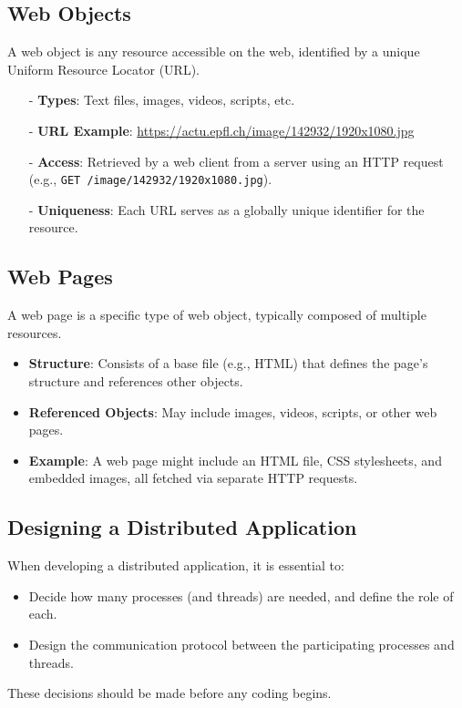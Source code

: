 \documentclass[../../compsys.tex]{subfiles}
\begin{document}
\subsection{Web Objects}
A web object is any resource accessible on the web, identified by a unique Uniform Resource Locator (URL).

\begin{itemize}[label=$\bullet$]
    \item[-] \textbf{Types}: Text files, images, videos, scripts, etc.
    \item[-] \textbf{URL Example}: \url{https://actu.epfl.ch/image/142932/1920x1080.jpg}
    \item[-] \textbf{Access}: Retrieved by a web client from a server using an HTTP request (e.g., \texttt{GET /image/142932/1920x1080.jpg}).
    \item[-] \textbf{Uniqueness}: Each URL serves as a globally unique identifier for the resource.
\end{itemize}

\subsection{Web Pages}
A web page is a specific type of web object, typically composed of multiple resources.

\begin{itemize}[label=$\bullet$]
    \item \textbf{Structure}: Consists of a base file (e.g., HTML) that defines the page's structure and references other objects.
    \item \textbf{Referenced Objects}: May include images, videos, scripts, or other web pages.
    \item \textbf{Example}: A web page might include an HTML file, CSS stylesheets, and embedded images, all fetched via separate HTTP requests.
\end{itemize}

\subsection{Designing a Distributed Application}

When developing a distributed application, it is essential to:
\begin{itemize}
    \item Decide how many processes (and threads) are needed, and define the role of each.
    \item Design the communication protocol between the participating processes and threads.
\end{itemize}
These decisions should be made before any coding begins.
\end{document}
